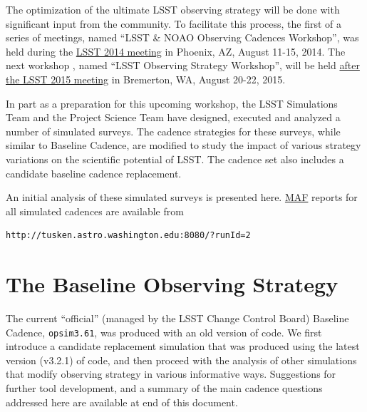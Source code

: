 The optimization of the ultimate LSST observing strategy will be done
with significant input from  the community. To facilitate this
process, the first of a series of meetings, named ``LSST \& NOAO
Observing Cadences Workshop'', was held during the
\href{https://project.lsst.org/meetings/ocw}{LSST 2014 meeting} in
Phoenix, AZ, August 11-15, 2014. The next workshop , named ``LSST
Observing Strategy Workshop'',  will be held
\href{http://lsstsciencecollaborations.github.io/ObservingStrategy/}{after
the LSST 2015 meeting} in Bremerton, WA, August 20-22, 2015.

In part as a preparation for this upcoming workshop, the LSST
Simulations Team and the Project Science Team have designed, executed
and analyzed a number of simulated surveys.  The cadence strategies
for these surveys, while similar to Baseline Cadence, are modified to
study the impact of various strategy variations on the scientific
potential of LSST. The cadence set also includes a candidate baseline
cadence replacement.

An initial analysis of these simulated surveys is presented here.
\href{https://confluence.lsstcorp.org/display/SIM/MAF+documentation}{MAF}
reports for all simulated cadences are available from \begin{verbatim}
http://tusken.astro.washington.edu:8080/?runId=2 \end{verbatim}

\listofopsimdbs

\navigationbar


\section{The Baseline Observing Strategy}
\def\secname{intro:baseline}\label{sec:\secname}

The current ``official'' (managed by the LSST Change Control Board)
Baseline Cadence, \texttt{opsim3.61},  was produced with an old version of
\OpSim code. We first introduce a candidate replacement simulation
that was produced using  the latest version (v3.2.1) of \OpSim code,
and then proceed with the analysis of other simulations that modify
observing strategy in various informative ways. Suggestions for
further tool development, and a summary of the main cadence questions
addressed  here are available at end of this document.


